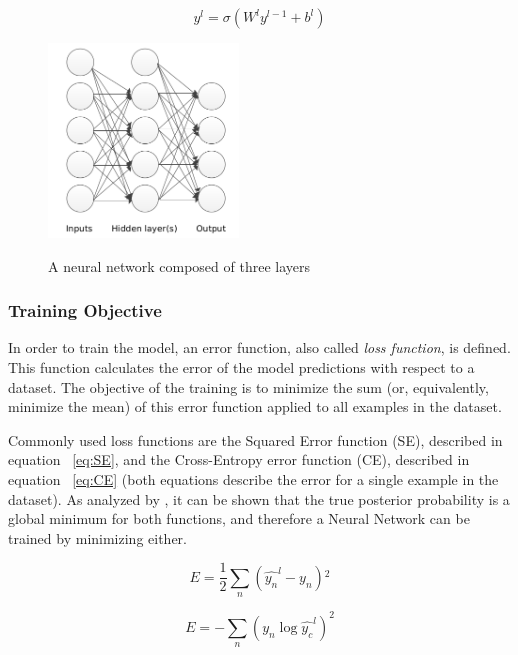 \begin{equation}
y^{l} = \sigma(W^{l}y^{l-1}+ b^{l}) 
\label{eq:multi}
\end{equation}


\begin{figure}[H]
	\centering
	{\includegraphics[width=0.45\textwidth]{images/mann}}
	\caption{A neural network composed of three layers}
	\label{fig:multi}
\end{figure}

\subsubsection{Training Objective} 
In order to train the model, an error function, also called \textit{loss function}, is defined. This function calculates the error of the model predictions with respect to a dataset. The objective of the training is to minimize the sum (or, equivalently, minimize the mean) of this error function applied to all examples in the dataset. 

\indent Commonly used loss functions are the Squared Error function (SE), described in equation ~\ref{eq:SE}, and the Cross-Entropy error function (CE), described in equation ~\ref{eq:CE} (both equations describe the error for a single example in the dataset). As analyzed by \citealt{golik2013cross}, it can be shown that the true posterior probability is a global minimum for both functions, and therefore a Neural Network can be trained by minimizing either. 

\begin{equation}
E = \frac{1}{2} \sum\limits_{n} ( \hat{y_n}^{l} - y_n ){^2}
\label{eq:SE}
\end{equation}

\begin{equation}
E = -\sum\limits_{n}(y_n \log \hat{y_c}^{l})^{2}
\label{eq:CE}
\end{equation}

